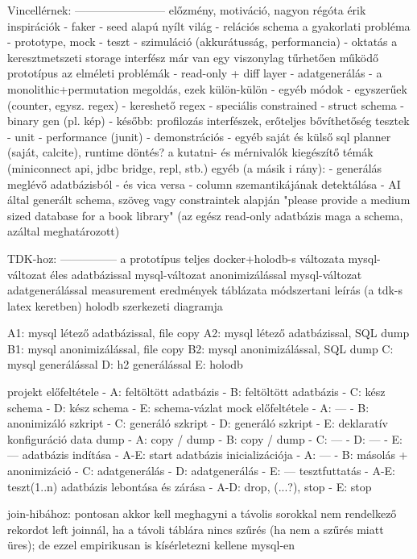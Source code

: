 \documentclass[
    parspace, %
    noindent, %
]{elteiktdk}[2023/04/10]
\begin{document}
{Vincellérnek:
------------------------
előzmény, motiváció, nagyon régóta érik
inspirációk
  - faker
  - seed alapú nyílt világ
  - relációs schema
a gyakorlati probléma
  - prototype, mock
  - teszt
  - szimuláció (akkurátusság, performancia)
  - oktatás
a keresztmetszeti storage interfész
már van egy viszonylag tűrhetően működő prototípus
az elméleti problémák
  - read-only + diff layer
  - adatgenerálás
     - a monolithic+permutation megoldás, ezek külön-külön
     - egyéb módok
         - egyszerűek (counter, egysz. regex)
         - kereshető regex
         - speciális constrained
         - struct schema
         - binary gen (pl. kép)
  - később: profilozás
interfészek, erőteljes bővíthetőség
tesztek
  - unit
  - performance (junit)
  - demonstrációs
  - egyéb
saját és külső sql planner (saját, calcite), runtime döntés?
a kutatni- és mérnivalók
kiegészítő témák (miniconnect api, jdbc bridge, repl, stb.)
egyéb (a másik i rány):
   - generálás meglévő adatbázisból
      - és vica versa
      - column szemantikájának detektálása
   - AI által generált schema, szöveg vagy constraintek alapján
     "please provide a medium sized database for a book library"
        (az egész read-only adatbázis maga a schema, azáltal meghatározott)

TDK-hoz:
---------------
a prototípus teljes docker+holodb-s változata
mysql-változat éles adatbázissal
mysql-változat anonimizálással
mysql-változat adatgenerálással
measurement
eredmények táblázata
módszertani leírás (a tdk-s latex keretben)
holodb szerkezeti diagramja

A1: mysql létező adatbázissal, file copy
A2: mysql létező adatbázissal, SQL dump
B1: mysql anonimizálással, file copy
B2: mysql anonimizálással, SQL dump
C: mysql generálással
D: h2 generálással
E: holodb

projekt előfeltétele
- A: feltöltött adatbázis
- B: feltöltött adatbázis
- C: kész schema
- D: kész schema
- E: schema-vázlat
mock előfeltétele
- A: ---
- B: anonimizáló szkript
- C: generáló szkript
- D: generáló szkript
- E: deklaratív konfiguráció
data dump
- A: copy / dump
- B: copy / dump
- C: ---
- D: ---
- E: ---
adatbázis indítása
- A-E: start
adatbázis inicializációja
- A: ---
- B: másolás + anonimizáció
- C: adatgenerálás
- D: adatgenerálás
- E: ---
tesztfuttatás
- A-E: teszt(1..n)
adatbázis lebontása és zárása
- A-D: drop, (...?), stop
- E: stop

join-hibához:
pontosan akkor kell meghagyni a távolis sorokkal nem rendelkező rekordot left joinnál, ha a távoli táblára nincs szűrés (ha nem a szűrés miatt üres); de ezzel empirikusan is kísérletezni kellene mysql-en

}
\end{document}
